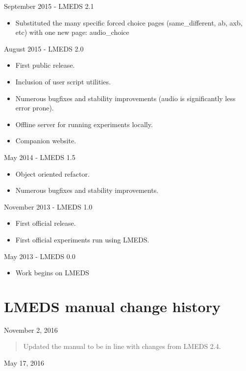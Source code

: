 September 2015 - LMEDS 2.1

\begin{itemize}
\item Substituted the many specific forced choice pages (same\_different, ab, axb, etc) with one new page: audio\_choice
\end{itemize}

August 2015 - LMEDS 2.0

\begin{itemize}
\item First public release.  
\item Inclusion of user script utilities.
\item Numerous bugfixes and stability improvements (audio is significantly less error prone).  
\item Offline server for running experiments locally.
\item Companion website.
\end{itemize}

May 2014 - LMEDS 1.5

\begin{itemize}
\item Object oriented refactor.
\item Numerous bugfixes and stability improvements.
\end{itemize}

November 2013 - LMEDS 1.0

\begin{itemize}
\item First official release.  
\item First official experiments run using LMEDS.
\end{itemize}

May 2013 - LMEDS 0.0

\begin{itemize}
\item Work begins on LMEDS
\end{itemize}


\section{LMEDS manual change history}

November 2, 2016

\begin{quote}
Updated the manual to be in line with changes from LMEDS 2.4.
\end{quote}

May 17, 2016

